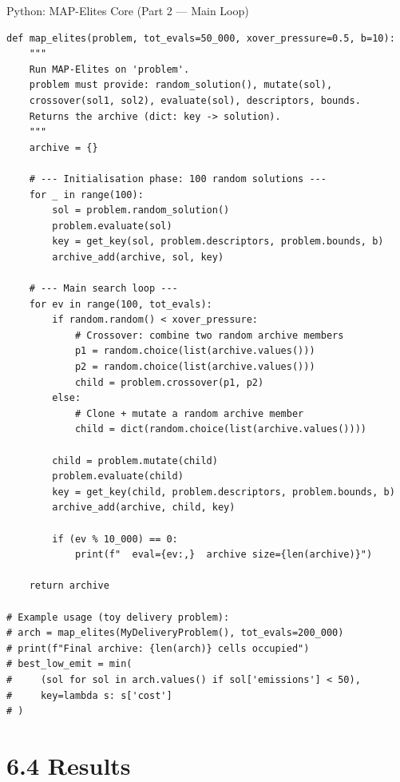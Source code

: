 \documentclass[aspectratio=169,10pt]{beamer}
\begin{document}
\begin{frame}[fragile]{Python: MAP-Elites Core (Part 2 --- Main Loop)}

\begin{lstlisting}[style=python, caption={Python: MAP-Elites main loop}]
def map_elites(problem, tot_evals=50_000, xover_pressure=0.5, b=10):
    """
    Run MAP-Elites on 'problem'.
    problem must provide: random_solution(), mutate(sol),
    crossover(sol1, sol2), evaluate(sol), descriptors, bounds.
    Returns the archive (dict: key -> solution).
    """
    archive = {}

    # --- Initialisation phase: 100 random solutions ---
    for _ in range(100):
        sol = problem.random_solution()
        problem.evaluate(sol)
        key = get_key(sol, problem.descriptors, problem.bounds, b)
        archive_add(archive, sol, key)

    # --- Main search loop ---
    for ev in range(100, tot_evals):
        if random.random() < xover_pressure:
            # Crossover: combine two random archive members
            p1 = random.choice(list(archive.values()))
            p2 = random.choice(list(archive.values()))
            child = problem.crossover(p1, p2)
        else:
            # Clone + mutate a random archive member
            child = dict(random.choice(list(archive.values())))

        child = problem.mutate(child)
        problem.evaluate(child)
        key = get_key(child, problem.descriptors, problem.bounds, b)
        archive_add(archive, child, key)

        if (ev % 10_000) == 0:
            print(f"  eval={ev:,}  archive size={len(archive)}")

    return archive

# Example usage (toy delivery problem):
# arch = map_elites(MyDeliveryProblem(), tot_evals=200_000)
# print(f"Final archive: {len(arch)} cells occupied")
# best_low_emit = min(
#     (sol for sol in arch.values() if sol['emissions'] < 50),
#     key=lambda s: s['cost']
# )
\end{lstlisting}

\end{frame}

\section{6.4 Results}
\end{document}
